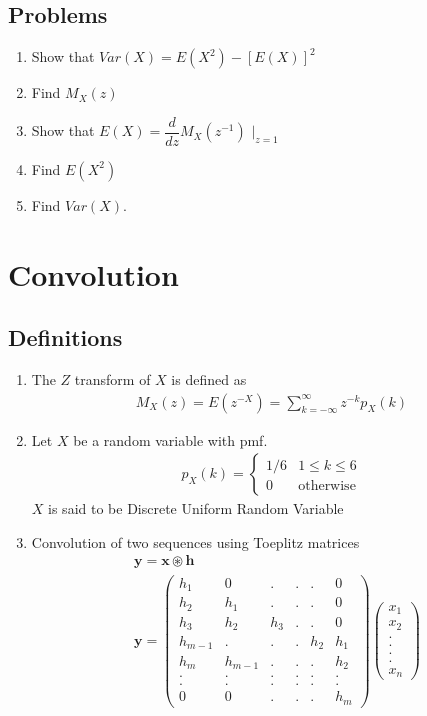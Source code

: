 \documentclass[journal,12pt,onecolumn]{IEEEtran}
\renewcommand\thesection{\arabic{section}}
\renewcommand\thesubsection{\thesection.\arabic{subsection}}
\providecommand{\brak}[1]{\ensuremath{\left(#1\right)}}
\theoremstyle{remark}
\newcommand{\myvec}[1]{\ensuremath{\begin{pmatrix}#1\end{pmatrix}}}
\numberwithin{equation}{section}
\let\vec\mathbf
\begin{document}
\subsection{Problems}
\begin{enumerate}[label=\arabic*.,ref=\thesubsection.\theenumi]
\item Show that $Var({X}) = E({X^2})-[E({X})]^2$
\item Find $M_X(z)$
\item Show that $E({X}) = \dfrac{d}{dz} M_X(z^{-1})$ $|_{z=1}$
\item Find $E({X^2})$
\item Find $Var({X})$. 
\end{enumerate}
	\section{Convolution}
\subsection{Definitions}
\begin{enumerate}[label=\arabic*.,ref=\thesubsection.\theenumi]
\item The $Z$ transform of $X$ is defined as 
	\begin{align}
	M_X(z)=E\brak{z^{-X}} = \sum_{k = -\infty}^{\infty}z^{-k}p_X(k)
	\end{align}
\item Let $X$ be a random variable with pmf. 
\begin{align}
    p_X(k) =
    \begin{cases}
1/6 & 1 \le k \le 6
\\
0 & \text{otherwise}
    \end{cases}
\end{align}
$X$ is said to be Discrete Uniform Random Variable
\item Convolution of two sequences using Toeplitz matrices
\begin{align}
& \vec{y} = \vec{x} \circledast \vec{h}\\
& \vec{y} = \myvec{h_1&0&.&.&.&0\\h_2&h_1&.&.&.&0\\h_3&h_2&h_3&.&.&0\\h_{m-1}&.&.&.&h_2&h_1\\h_m&h_{m-1}&.&.&.&h_2\\.&.&.&.&.&.\\.&.&.&.&.&.\\0&0&.&.&.&h_m}\myvec{x_1\\x_2\\.\\.\\.\\.\\x_n}
\end{align}
\end{enumerate}
\end{document}
